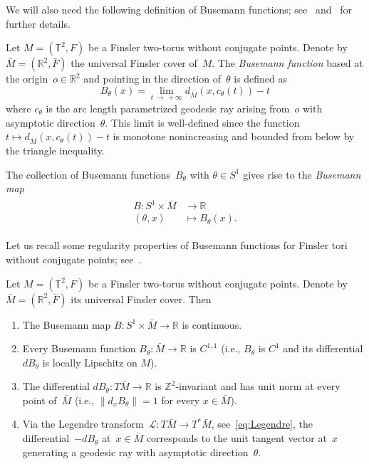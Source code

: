 \documentclass[AHL,Unicode,longabstracts,published]{cedram}
\newcommand{\LL}{\mathcal{L}}
\newcommand{\Z}{\mathbb{Z}}
\newcommand{\R}{\mathbb{R}}
\newcommand{\T}{\mathbb{T}}
\newcommand{\ie}{i.e.}
\begin{document}
We will also need the following definition of Busemann functions; see~\cite{CK95,CS86,esc77,Heb94} and~\cite{gro99} for further details.

\begin{definition}\label{def:Bus}
Let $M=(\T^2,F)$ be a Finsler two-torus without conjugate points. Denote by~$\bar{M}=(\R^2,\bar{F})$ the universal Finsler cover of~$M$. The \emph{Busemann function} based at the origin~\mbox{$o \in \R^2$} and pointing in the direction of~$\theta$ is defined as
\[
B_\theta(x) = \lim_{t\,\to\,+\infty} d_{\bar{M}}(x,c_\theta(t)) -t
\]
where $c_\theta$ is the arc length parametrized geodesic ray arising from~$o$ with asymptotic direction~$\theta$. This limit is well-defined since the function $t \mapsto d_{\bar{M}}(x,c_\theta(t)) -t$ is monotone nonincreasing and bounded from below by the triangle inequality.

The collection of Busemann functions~$B_\theta$ with $\theta \in S^1$ gives rise to the \emph{Busemann map}
\begin{align*}
\begin{split}
B:S^1 \times \bar{M} & \rightarrow \R \\
(\theta,x) & \mapsto B_\theta(x).
\end{split}
\end{align*}
\end{definition}

Let us recall some regularity properties of Busemann functions for Finsler tori without conjugate points; see~\cite{CK95,CS86,esc77,Heb94}.

\begin{prop}\label{prop:heber}
Let $M=(\T^2,F)$ be a Finsler two-torus without conjugate points. Denote by~$\bar{M}=(\R^2,\bar{F})$ its universal Finsler cover. Then
\begin{enumerate}
\item\label{heber1} The Busemann map $B:S^1 \times \bar{M} \rightarrow \R$ is continuous.
\item\label{heber2} Every Busemann function $B_\theta : \bar{M} \to \R$ is $C^{1,1}$ (\ie, $B_{\theta}$ is $C^{1}$ and its differential $dB_{\theta}$ is locally Lipschitz on $M$). 
\item\label{heber3} The differential $dB_\theta:T\bar{M} \to \R$ is $\Z^2$-invariant and has unit norm at every point of~$\bar{M}$ (\ie, $\lVert d_{x}B_{\theta} \rVert=1$ for every $x\in\bar{M}$). 
\item\label{heber4} Via the Legendre transform~$\LL:T\bar{M} \to T^*\bar{M}$, see~\eqref{eq:Legendre}, the differential~$-dB_\theta$ at~$x \in \bar{M}$ corresponds to the unit tangent vector at~$x$ generating a geodesic ray with asymptotic direction~$\theta$.
\end{enumerate}
\end{prop}
\end{document}

